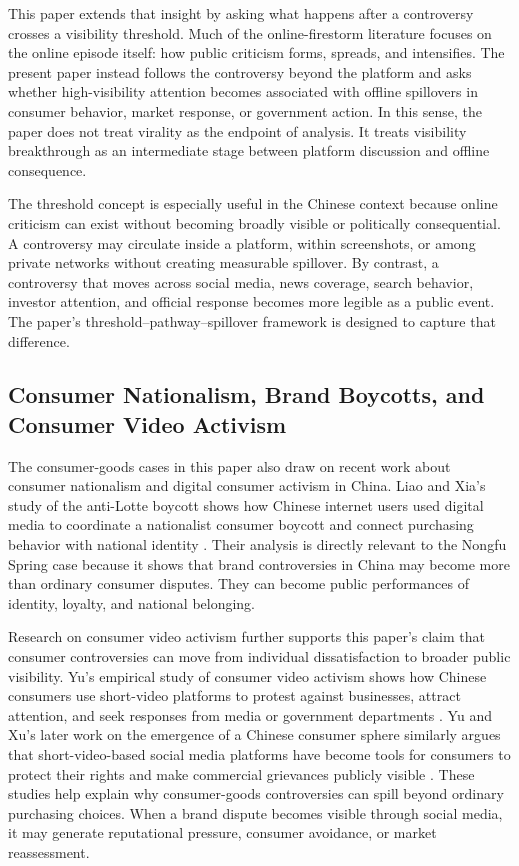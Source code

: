 \documentclass[conference]{IEEEtran}
\begin{document}
This paper extends that insight by asking what happens after a controversy crosses a visibility threshold. Much of the online-firestorm literature focuses on the online episode itself: how public criticism forms, spreads, and intensifies. The present paper instead follows the controversy beyond the platform and asks whether high-visibility attention becomes associated with offline spillovers in consumer behavior, market response, or government action. In this sense, the paper does not treat virality as the endpoint of analysis. It treats visibility breakthrough as an intermediate stage between platform discussion and offline consequence.

The threshold concept is especially useful in the Chinese context because online criticism can exist without becoming broadly visible or politically consequential. A controversy may circulate inside a platform, within screenshots, or among private networks without creating measurable spillover. By contrast, a controversy that moves across social media, news coverage, search behavior, investor attention, and official response becomes more legible as a public event. The paper's threshold--pathway--spillover framework is designed to capture that difference.

\subsection{Consumer Nationalism, Brand Boycotts, and Consumer Video Activism}

The consumer-goods cases in this paper also draw on recent work about consumer nationalism and digital consumer activism in China. Liao and Xia's study of the anti-Lotte boycott shows how Chinese internet users used digital media to coordinate a nationalist consumer boycott and connect purchasing behavior with national identity \cite{liao2023consumer}. Their analysis is directly relevant to the Nongfu Spring case because it shows that brand controversies in China may become more than ordinary consumer disputes. They can become public performances of identity, loyalty, and national belonging.

Research on consumer video activism further supports this paper's claim that consumer controversies can move from individual dissatisfaction to broader public visibility. Yu's empirical study of consumer video activism shows how Chinese consumers use short-video platforms to protest against businesses, attract attention, and seek responses from media or government departments \cite{yu2021video}. Yu and Xu's later work on the emergence of a Chinese consumer sphere similarly argues that short-video-based social media platforms have become tools for consumers to protect their rights and make commercial grievances publicly visible \cite{yu2023consumer}. These studies help explain why consumer-goods controversies can spill beyond ordinary purchasing choices. When a brand dispute becomes visible through social media, it may generate reputational pressure, consumer avoidance, or market reassessment.
\end{document}
